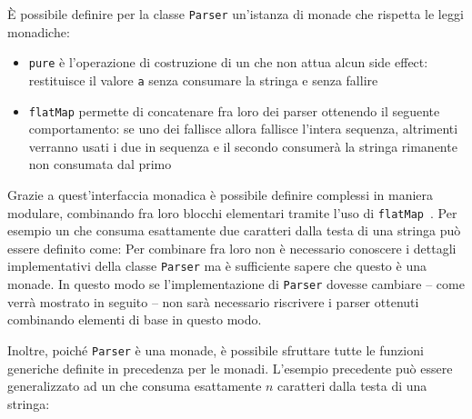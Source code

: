 È possibile definire per la classe \lstinline{Parser} un'istanza di monade che rispetta le leggi monadiche:

\begin{itemize}
  \item \lstinline{pure} è l'operazione di costruzione di un  che non attua alcun side effect: restituisce il valore \lstinline{a} senza consumare la stringa e senza fallire
  \item \lstinline{flatMap} permette di concatenare fra loro dei parser ottenendo il seguente comportamento: se uno dei  fallisce allora fallisce l'intera sequenza, altrimenti verranno usati i due  in sequenza e il secondo consumerà la stringa rimanente non consumata dal primo
\end{itemize}

Grazie a quest'interfaccia monadica è possibile definire  complessi in maniera modulare, combinando fra loro blocchi elementari tramite l'uso di \lstinline{flatMap}~\cite{cit:monadic-parsing-in-haskell}. Per esempio un  che consuma esattamente due caratteri dalla testa di una stringa può essere definito come:
Per combinare fra loro  non è necessario conoscere i dettagli implementativi della classe \lstinline{Parser} ma è sufficiente sapere che questo è una monade. In questo modo se l'implementazione di \lstinline{Parser} dovesse cambiare -- come verrà mostrato in seguito -- non sarà necessario riscrivere i parser ottenuti combinando elementi di base in questo modo.

Inoltre, poiché \lstinline{Parser} è una monade, è possibile sfruttare tutte le funzioni generiche definite in precedenza per le monadi. L'esempio precedente può essere generalizzato ad un  che consuma esattamente $n$ caratteri dalla testa di una stringa:

